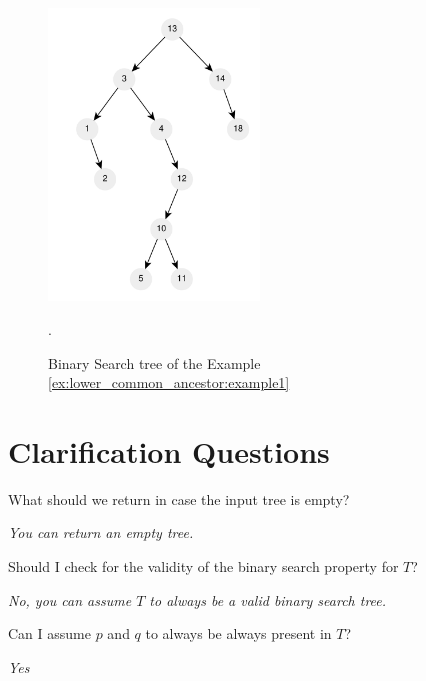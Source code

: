 \begin{figure}
	\centering
	\includegraphics[width=0.5\textwidth]{sources/lowest_common_ancestor/images/example1}
	\caption[Sample short caption]{Binary Search tree of the Example
	\ref{ex:lower_common_ancestor:example1}}.
	\label{fig:lowest_common_ancestor:example1}
\end{figure}

\section{Clarification Questions}

\begin{QandA}
	\item \begin{questionitem} \begin{question} What should we return in case the input tree is empty?  \end{question} 	 
    \begin{answered}
		\textit{You can return an empty tree.}
	\end{answered} \end{questionitem}


	\item \begin{questionitem} \begin{question} Should I check for the validity of the binary search property for $T$?  \end{question} 	 
    \begin{answered}
		\textit{No, you can assume $T$ to always be a valid binary search tree.}
	\end{answered} \end{questionitem}

	\item \begin{questionitem} \begin{question} Can I assume $p$ and $q$ to always be always present in $T$?  \end{question} 	 
    \begin{answered}
		\textit{Yes}
	\end{answered} \end{questionitem}

	
\end{QandA}

